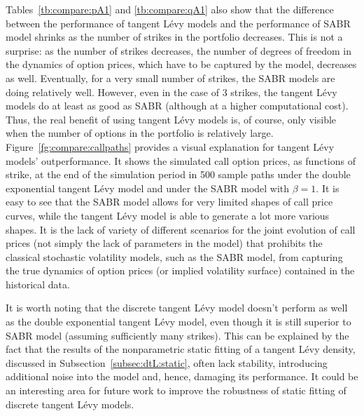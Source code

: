 \documentclass{article}
\numberwithin{equation}{section}
\begin{document}
Tables~\ref{tb:compare:pA1} and \ref{tb:compare:qA1} also show that the difference between the performance of tangent L\'evy models and the performance of SABR model shrinks as the number of strikes in the portfolio decreases. This is not a surprise: as the number of strikes decreases, the number of degrees of freedom in the dynamics of option prices, which have to be captured by the model, decreases as well. Eventually, for a very small number of strikes, the SABR models are doing relatively well. However, even in the case of 3 strikes, the tangent L\'{e}vy models do at least as good as SABR (although at a higher computational cost). Thus, the real benefit of using tangent L\'evy models is, of course, only visible when the number of options in the portfolio is relatively large.
Figure~\ref{fg:compare:callpaths} provides a visual explanation for tangent L\'{e}vy models' outperformance. It shows the simulated call option prices, as functions of strike, at the end of the simulation period in 500 sample paths under the double exponential tangent L\'{e}vy model and under the SABR model with $\beta=1$. It is easy to see that the SABR model allows for very limited shapes of call price curves, while the tangent L\'{e}vy model is able to generate a lot more various shapes. It is the lack of variety of different scenarios for the joint evolution of call prices (not simply the lack of parameters in the model) that prohibits the classical stochastic volatility models, such as the SABR model, from capturing the true dynamics of option prices (or implied volatility surface) contained in the historical data. 


It is worth noting that the discrete tangent L\'{e}vy model doesn't perform as well as the double exponential tangent L\'{e}vy model, even though it is still superior to SABR model (assuming sufficiently many strikes). 
This can be explained by the fact that the results of the nonparametric static fitting of a tangent L\'{e}vy density, discussed in Subsection~\ref{subsec:dtL:static}, often lack stability, introducing additional noise into the model and, hence, damaging its performance. It could be an interesting area for future work to improve the robustness of static fitting of discrete tangent L\'{e}vy models.




\end{document}
